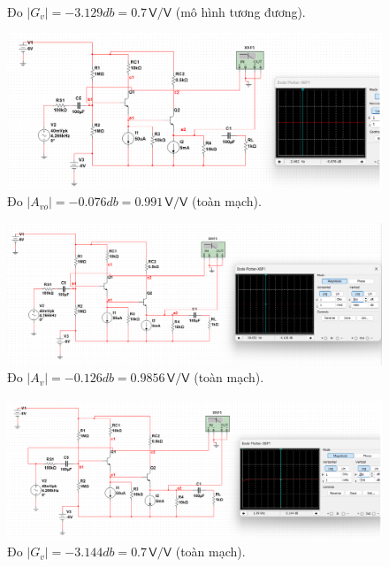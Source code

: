 \begin{itemize}[label=-]
\begin{figure}[H]
		\caption{Đo $|G_{v}| =-3.129 db = 0.7\,\textsf{V/V}$ (mô hình tương đương).}
	\end{figure}
	\begin{figure}[H]
		\centering
		\includegraphics[width=.9\linewidth]{./my-chapters/my-images/Question7/b_avo_toanmach.png}
		\caption{Đo $|A_{vo}| =-0.076 db = 0.991\,\textsf{V/V}$ (toàn mạch).}
	\end{figure}
	\begin{figure}[H]
		\centering
		\includegraphics[width=.9\linewidth]{./my-chapters/my-images/Question7/b_av_toanmach.png}
		\caption{Đo $|A_{v}| =-0.126 db = 0.9856  \,\textsf{V/V}$ (toàn mạch).}
	\end{figure}
	\begin{figure}[H]
		\centering
		\includegraphics[width=.9\linewidth]{./my-chapters/my-images/Question7/b_gv_toanmach.png}
		\caption{Đo $|G_{v}| =-3.144 db = 0.7  \,\textsf{V/V}$ (toàn mạch).}
	\end{figure}
\end{itemize}

